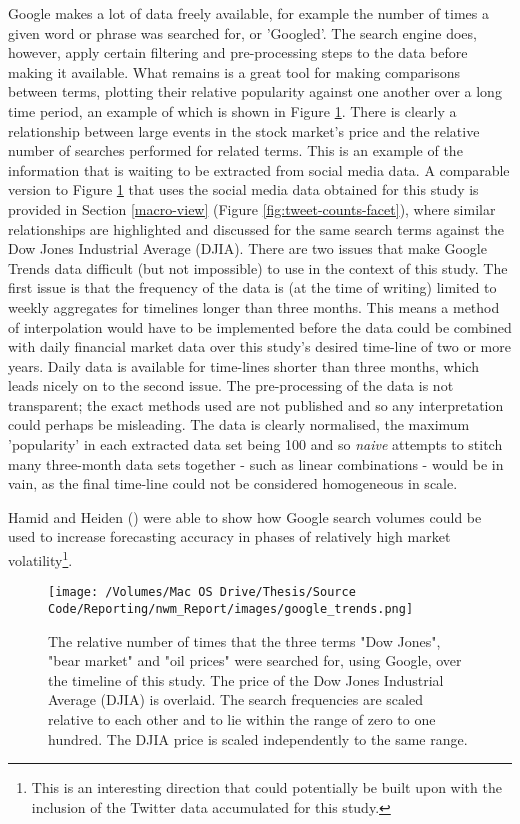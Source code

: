 \documentclass{article}
\begin{document}
Google makes a lot of data freely available, for example the number of times a given word or phrase was searched for, or 'Googled'. The search engine does, however, apply certain filtering and pre-processing steps to the data before making it available. What remains is a great tool for making comparisons between terms, plotting their relative popularity against one another over a long time period, an example of which is shown in Figure \ref{fig:gtrends}. There is clearly a relationship between large events in the stock market's price and the relative number of searches performed for related terms. This is an example of the information that is waiting to be extracted from social media data. A comparable version to Figure \ref{fig:gtrends} that uses the social media data obtained for this study is provided in Section \ref{macro-view} (Figure \ref{fig:tweet-counts-facet}), where similar relationships are highlighted and discussed for the same search terms against the Dow Jones Industrial Average (DJIA).
There are two issues that make Google Trends data difficult (but not impossible) to use in the context of this study. The first issue is that the frequency of the data is (at the time of writing) limited to weekly aggregates for timelines longer than three months. This means a method of interpolation would have to be implemented before the data could be combined with daily financial market data over this study's desired time-line of two or more years. Daily data is available for time-lines shorter than three months, which leads nicely on to the second issue. The pre-processing of the data is not transparent; the exact methods used are not published and so any interpretation could perhaps be misleading. The data is clearly normalised, the maximum 'popularity' in each extracted data set being 100 and so \emph{naive} attempts to stitch many three-month data sets together - such as linear combinations - would be in vain, as the final time-line could not be considered homogeneous in scale.

Hamid and Heiden (\cite{hamid2015forecasting}) were able to show how Google search volumes could be used to increase forecasting accuracy in phases of relatively high market volatility\footnote{This is an interesting direction that could potentially be built upon with the inclusion of the Twitter data accumulated for this study.}.

\begin{figure}[htb]
\centering
\texttt{[image: /Volumes/Mac OS Drive/Thesis/Source Code/Reporting/nwm\_Report/images/google\_trends.png]}
\caption[Google Trends data versus the DJIA price]{\label{fig:gtrends}The relative number of times that the three terms "Dow Jones", "bear market" and "oil prices" were searched for, using Google, over the timeline of this study. The price of the Dow Jones Industrial Average (DJIA) is overlaid. The search frequencies are scaled relative to each other and to lie within the range of zero to one hundred. The DJIA price is scaled independently to the same range.}
\end{figure}
\end{document}
